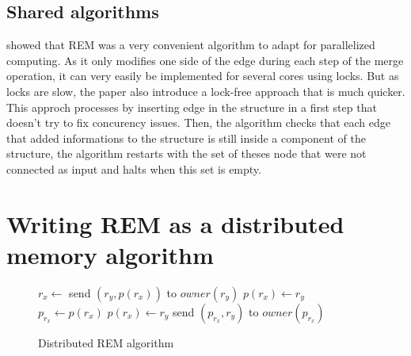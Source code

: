 \documentclass[12px]{article}
\begin{document}
    \subsection{Shared algorithms}
       showed that REM was a very convenient algorithm to adapt for parallelized computing. As it only modifies one side of the edge during each step of the merge operation, it can very easily be implemented for several cores using locks.
      But as locks are slow, the paper also introduce a lock-free approach that is much quicker. This approch processes by inserting edge in the structure in a first step that doesn't try to fix concurency issues. Then, the algorithm checks that each edge that added informations to the structure is still inside a component of the structure, the algorithm restarts with the set of theses node that were not connected as input and halts when this set is empty.


  \section{Writing REM as a distributed memory algorithm}
    \setlength\intextsep{0pt}
    \begin{wrapfigure}{r}{6.5cm}
      \centering
      \begin{minipage}{\linewidth}
        \begin{algorithm}[H]
          \caption{Distributed REM algorithm}%
          \label{alg:rem_distributed}
          \begin{algorithmic}[1]
              \State $r_x \gets$ 
              \State
                \State send $(r_y, p(r_x))$ to $owner(r_y)$
                  \State $p(r_x) \gets r_y$
                \Else
                  \State $p_{r_x} \gets p(r_x)$
                  \State $p(r_x) \gets r_y$
                  \State send $(p_{r_x}, r_y)$ to $owner(p_{r_x})$
                \EndIf
              \EndIf
            \EndFunction
         \end{algorithmic}
        \end{algorithm}
      \end{minipage}
    \end{wrapfigure}
\end{document}
